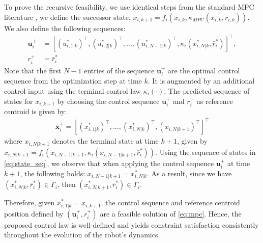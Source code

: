 To prove the recursive feasibility, we use identical steps from the standard MPC literature \cite{ferramosca2009mpc,limon2018nonlinear,limon2008mpc}, we define the successor state, $x_{i,k+1} = f_i(x_{i,k}, \kappa_{MPC}(x_{i,k}, r_{i,k}))$. We also define the following sequences:
\begin{align}
\label{eq:inp_seq}
    \mathbf{u}_i^+ &= [(u_{i,1|k}^*)^\top, (u_{i,2|k}^*)^\top, \dots, (u_{i,N-1|k}^*)^\top, \kappa_i(x_{i,N|k}^*, \bar{r}_i^*)]^\top, \nonumber
    \\ r_i^+ &=  \bar{r}_i^*
\end{align}
Note that the first $N-1$ entries of the sequence $\mathbf{u}_i^+$ are the optimal control sequence from the optimization step at time $k$. It is augmented by an additional control input using the terminal control law $\kappa_i(\cdot)$. The predicted sequence of states for $x_{i,k+1}$ by choosing the control sequence $\mathbf{u}_i^+$ and $ r_i^+$ as reference centroid is given by:
\begin{align}
\label{eq:state_seq}
    \mathbf{x}_i^+ = [(x_{i,1|k}^*)^\top, \dots, (x_{i,N|k}^*)^\top, (x_{i,N|k+1})^\top]^\top
\end{align}
where $x_{i,N|k+1}$ denotes the terminal state at time $k+1$, given by $x_{i,N|k+1} = f_i(x_{i,N-1|k+1}, \kappa_i(x_{i,N-1|k+1}, \bar{r}_i^*))$. Using the sequence of states in \eqref{eq:state_seq}, we observe that when applying the control sequence $\mathbf{u}_i^+$ at time $k+1$, the following holds: $x_{i,N-1|k+1} = x_{i,N|k}^*$.
As a result, since we have $(x_{i,N|k}^*, \bar{r}_i^*) \in \Gamma_i$, then $(x_{i,N|k+1}^*, \bar{r}_i^*)\in \Gamma_i$.

Therefore, given $x_{i,1|k}^* = x_{i,k+1}$, the control sequence and reference centroid position defined by $(\mathbf{u}_i^+,r_i^+)$ are a feasible solution of \eqref{eq:mpc}. Hence, the proposed control law is well-defined and yields constraint satisfaction consistently throughout the evolution of the robot's dynamics.

